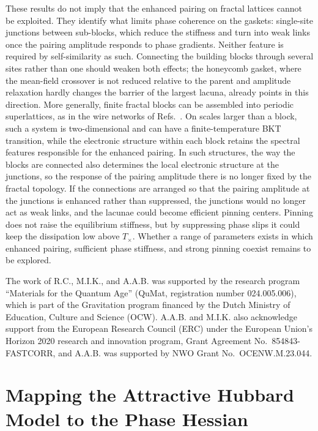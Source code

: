\documentclass[aps,prb,twocolumn,superscriptaddress,floatfix]{revtex4-2}
\begin{document}
These results do not imply that the enhanced pairing on fractal lattices
cannot be exploited. They identify what limits phase coherence on the gaskets:
single-site junctions between sub-blocks, which reduce the stiffness and turn
into weak links once the pairing amplitude responds to phase gradients.
Neither feature is required by self-similarity as such. Connecting the
building blocks through several sites rather than one should weaken both
effects; the honeycomb gasket, where the mean-field crossover is not reduced
relative to the parent and amplitude relaxation hardly changes the barrier of
the largest lacuna, already points in this direction. More generally, finite
fractal blocks can be assembled into periodic superlattices, as in the wire
networks of Refs.~\cite{Meyer1991,Meyer1992,Meyer2002}. On scales larger than
a block, such a system is two-dimensional and can have a finite-temperature
BKT transition, while the electronic structure within each block retains the
spectral features responsible for the enhanced pairing. In such structures,
the way the blocks are connected also determines the local electronic
structure at the junctions, so the response of the pairing amplitude there is
no longer fixed by the fractal topology. If the connections are arranged so
that the pairing amplitude at the junctions is enhanced rather than
suppressed, the junctions would no longer act as weak links, and the lacunae
could become efficient pinning centers. Pinning does not raise the
equilibrium stiffness, but by suppressing phase slips it could keep the
dissipation low above $T_\times$. Whether a range of parameters exists in
which enhanced pairing, sufficient phase stiffness, and strong pinning
coexist remains to be explored.

\begin{acknowledgments}
The work of R.C., M.I.K., and A.A.B. was supported by the research program ``Materials for the Quantum Age'' (QuMat, registration number 024.005.006), which is part of the Gravitation program financed by the Dutch Ministry of Education, Culture and Science (OCW). A.A.B. and M.I.K. also acknowledge support from the European Research Council (ERC) under the European Union's Horizon 2020 research and innovation program, Grant Agreement No.~854843-FASTCORR, and A.A.B. was supported by NWO Grant No.~OCENW.M.23.044.
\end{acknowledgments}

\appendix

\section{Mapping the Attractive Hubbard Model to the Phase Hessian}
\label{app:hessian}
\end{document}
